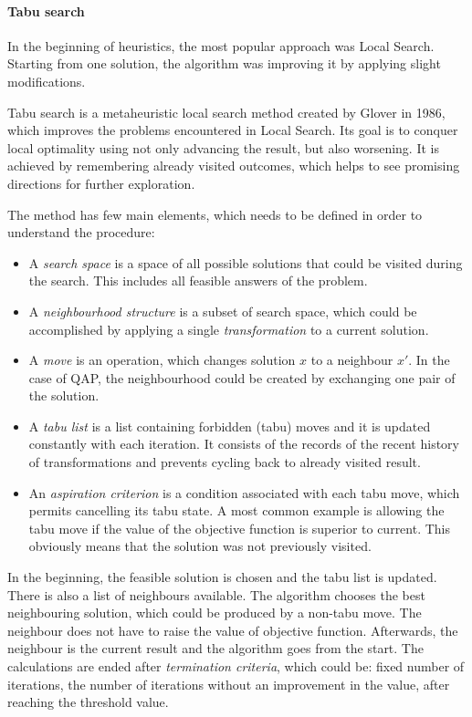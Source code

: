 \paragraph{Tabu search}

In the beginning of heuristics, the most popular approach was Local Search.
Starting from one solution, the algorithm was improving it by applying slight modifications.

Tabu search is a metaheuristic local search method created by Glover \cite{glover1986future} in 1986, which improves the problems encountered in Local Search.
Its goal is to conquer local optimality using not only advancing the result, but also worsening.
It is achieved by remembering already visited outcomes, which helps to see promising directions for further exploration.

The method has few main elements, which needs to be defined in order to understand the procedure:
\begin{itemize}
  \item A \textit{search space} is a space of all possible solutions that could be visited during the search. This includes all feasible answers of the problem.
  \item A \textit{neighbourhood structure} is a subset of search space, which could be accomplished by applying a single \textit{transformation} to a current solution.
  \item A \textit{move} is an operation, which changes solution $x$ to a neighbour $x'$. In the case of QAP, the neighbourhood could be created by exchanging one pair of the solution.
  \item A \textit{tabu list} is a list containing forbidden (tabu) moves and it is updated constantly with each iteration. It consists of the records of the recent history of transformations and prevents cycling back to already visited result.
  \item An \textit{aspiration criterion} is a condition associated with each tabu move, which permits cancelling its tabu state. A most common example is allowing the tabu move if the value of the objective function is superior to current. This obviously means that the solution was not previously visited.
\end{itemize}

In the beginning, the feasible solution is chosen and the tabu list is updated.
There is also a list of neighbours available.
The algorithm chooses the best neighbouring solution, which could be produced by a non-tabu move.
The neighbour does not have to raise the value of objective function.
Afterwards, the neighbour is the current result and the algorithm goes from the start.
The calculations are ended after \textit{termination criteria}, which could be: fixed number of iterations, the number of iterations without an improvement in the value, after reaching the threshold value.

